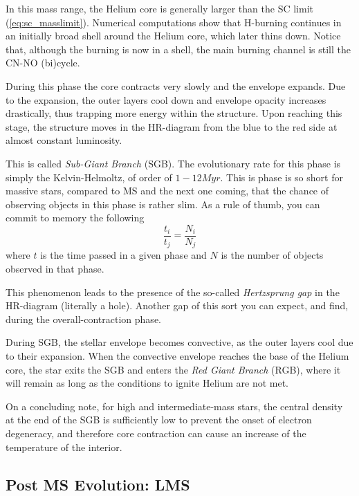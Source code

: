 In this mass range, the Helium core is generally larger than the SC limit (\ref{eq:sc_masslimit}). Numerical computations show that H-burning continues in an initially broad shell around the Helium core, which later thins down. Notice that, although the burning is now in a shell, the main burning channel is still the CN-NO (bi)cycle.
\par During this phase the core contracts very slowly and the envelope expands. Due to the expansion, the outer layers cool down and envelope opacity increases drastically, thus trapping more energy within the structure. Upon reaching this stage, the structure moves in the HR-diagram from the blue to the red side at almost constant luminosity.
\par This is called \emph{Sub-Giant Branch} (SGB). The evolutionary rate for this phase is simply the Kelvin-Helmoltz, of order of $1-12\unit{Myr}$. This is phase is so short for massive stars, compared to MS and the next one coming, that the chance of observing objects in this phase is rather slim. As a rule of thumb, you can commit to memory the following
\begin{equation*}
    \frac{t_{i}}{t_{j}} = \frac{N_{i}}{N_{j}}
\end{equation*}
where $t$ is the time passed in a given phase and $N$ is the number of objects observed in that phase.
\par This phenomenon leads to the presence of the so-called \emph{Hertzsprung gap} in the HR-diagram (literally a hole). Another gap of this sort you can expect, and find, during the overall-contraction phase.
\par During SGB, the stellar envelope becomes convective, as the outer layers cool due to their expansion. When the convective envelope reaches the base of the Helium core, the star exits the SGB and enters the \emph{Red Giant Branch} (RGB), where it will remain as long as the conditions to ignite Helium are not met.
\par On a concluding note, for high and intermediate-mass stars, the central density at the end of the SGB is sufficiently low to prevent the onset of electron degeneracy, and therefore core contraction can cause an increase of the temperature of the interior.

\subsection{Post MS Evolution: LMS}

